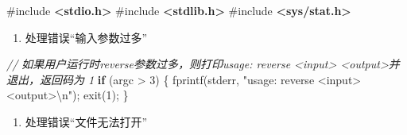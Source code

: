 \documentclass[
]{article}
\newenvironment{Shaded}{}{}
\newcommand{\CommentTok}[1]{\textcolor[rgb]{0.38,0.63,0.69}{\textit{#1}}}
\newcommand{\ControlFlowTok}[1]{\textcolor[rgb]{0.00,0.44,0.13}{\textbf{#1}}}
\newcommand{\DecValTok}[1]{\textcolor[rgb]{0.25,0.63,0.44}{#1}}
\newcommand{\ImportTok}[1]{\textcolor[rgb]{0.00,0.50,0.00}{\textbf{#1}}}
\newcommand{\NormalTok}[1]{#1}
\newcommand{\OperatorTok}[1]{\textcolor[rgb]{0.40,0.40,0.40}{#1}}
\newcommand{\PreprocessorTok}[1]{\textcolor[rgb]{0.74,0.48,0.00}{#1}}
\newcommand{\SpecialCharTok}[1]{\textcolor[rgb]{0.25,0.44,0.63}{#1}}
\newcommand{\StringTok}[1]{\textcolor[rgb]{0.25,0.44,0.63}{#1}}
\begin{document}
\begin{Shaded}
  \begin{Highlighting}[]
    \PreprocessorTok{\#include }\ImportTok{\textless{}stdio.h\textgreater{}}
    \PreprocessorTok{\#include }\ImportTok{\textless{}stdlib.h\textgreater{}}
    \PreprocessorTok{\#include }\ImportTok{\textless{}sys/stat.h\textgreater{}}
  \end{Highlighting}
\end{Shaded}

\begin{enumerate}
  \def\labelenumi{\arabic{enumi}.}
  \item
        处理错误``输入参数过多''
\end{enumerate}

\begin{Shaded}
  \begin{Highlighting}[]
    \CommentTok{// 如果用户运行时reverse参数过多，则打印usage: reverse \textless{}input\textgreater{} \textless{}output\textgreater{}并退出，返回码为 1}
    \ControlFlowTok{if} \OperatorTok{(}\NormalTok{argc }\OperatorTok{\textgreater{}} \DecValTok{3}\OperatorTok{)} \OperatorTok{\{}
    \NormalTok{    fprintf}\OperatorTok{(}\NormalTok{stderr}\OperatorTok{,} \StringTok{"usage: reverse \textless{}input\textgreater{} \textless{}output\textgreater{}}\SpecialCharTok{\textbackslash{}n}\StringTok{"}\OperatorTok{);}
    \NormalTok{    exit}\OperatorTok{(}\DecValTok{1}\OperatorTok{);}
    \OperatorTok{\}}
  \end{Highlighting}
\end{Shaded}

\begin{enumerate}[resume]
  \def\labelenumi{\arabic{enumi}.}
  \item
        处理错误``文件无法打开''
\end{enumerate}
\end{document}
